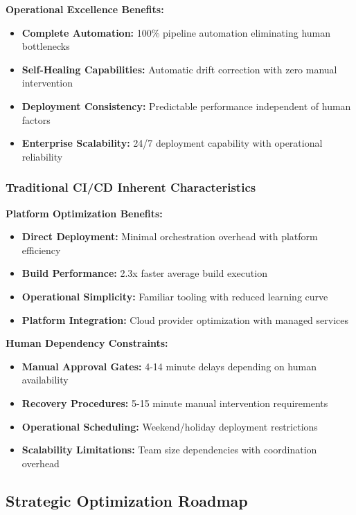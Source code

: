 \textbf{Operational Excellence Benefits:}
\begin{itemize}
\item \textbf{Complete Automation:} 100\% pipeline automation eliminating human bottlenecks
\item \textbf{Self-Healing Capabilities:} Automatic drift correction with zero manual intervention
\item \textbf{Deployment Consistency:} Predictable performance independent of human factors
\item \textbf{Enterprise Scalability:} 24/7 deployment capability with operational reliability
\end{itemize}

\subsubsection{Traditional CI/CD Inherent Characteristics}

\textbf{Platform Optimization Benefits:}
\begin{itemize}
\item \textbf{Direct Deployment:} Minimal orchestration overhead with platform efficiency
\item \textbf{Build Performance:} 2.3x faster average build execution
\item \textbf{Operational Simplicity:} Familiar tooling with reduced learning curve
\item \textbf{Platform Integration:} Cloud provider optimization with managed services
\end{itemize}

\textbf{Human Dependency Constraints:}
\begin{itemize}
\item \textbf{Manual Approval Gates:} 4-14 minute delays depending on human availability
\item \textbf{Recovery Procedures:} 5-15 minute manual intervention requirements
\item \textbf{Operational Scheduling:} Weekend/holiday deployment restrictions
\item \textbf{Scalability Limitations:} Team size dependencies with coordination overhead
\end{itemize}

\subsection{Strategic Optimization Roadmap}
\label{subsec:optimization_roadmap}

